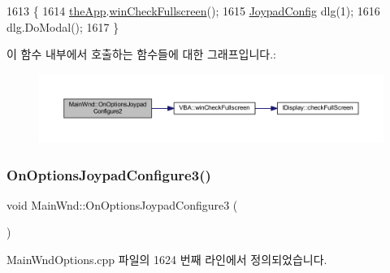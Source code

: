 \begin{DoxyCode}
1613 \{
1614   \mbox{\hyperlink{_v_b_a_8cpp_a8095a9d06b37a7efe3723f3218ad8fb3}{theApp}}.\mbox{\hyperlink{class_v_b_a_a340eaeeb7fcfc242f08ac3442d991a96}{winCheckFullscreen}}();
1615   \mbox{\hyperlink{class_joypad_config}{JoypadConfig}} dlg(1);
1616   dlg.DoModal();
1617 \}
\end{DoxyCode}
이 함수 내부에서 호출하는 함수들에 대한 그래프입니다.\+:
\nopagebreak
\begin{figure}[H]
\begin{center}
\leavevmode
\includegraphics[width=350pt]{class_main_wnd_afb2b65a9fbb1b37c10b73c1752b94f4e_cgraph}
\end{center}
\end{figure}
\mbox{\label{class_main_wnd_a0def1429ded1fc96ecdda38a7e5257b8}} 
\subsubsection{\texorpdfstring{On\+Options\+Joypad\+Configure3()}{OnOptionsJoypadConfigure3()}}
{\footnotesize\ttfamily void Main\+Wnd\+::\+On\+Options\+Joypad\+Configure3 (\begin{DoxyParamCaption}{ }\end{DoxyParamCaption})\hspace{0.3cm}{\ttfamily [protected]}}



Main\+Wnd\+Options.\+cpp 파일의 1624 번째 라인에서 정의되었습니다.


